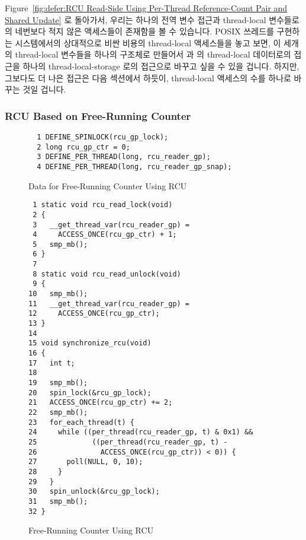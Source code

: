 Figure~\ref{fig:defer:RCU Read-Side Using Per-Thread Reference-Count Pair and Shared Update}
로 돌아가서, 우리는 하나의 전역 변수 접근과 thread-local 변수들로의 네번보다
적지 않은 액세스들이 존재함을 볼 수 있습니다.
POSIX 쓰레드를 구현하는 시스템에서의 상대적으로 비싼 비용의 thread-local
액세스들을 놓고 보면, 이 세개의 thread-local 변수들을 하나의 구조체로 만들어서
 과  의 thread-local 데이터로의
접근을 하나의 thread-local-storage 로의 접근으로 바꾸고 싶을 수 있을 겁니다.
하지만, 그보다도 더 나은 접근은 다음 섹션에서 하듯이, thread-local 액세스의
수를 하나로 바꾸는 것일 겁니다.
\iffalse

Referring back to
Figure~\ref{fig:defer:RCU Read-Side Using Per-Thread Reference-Count Pair and Shared Update},
we see that there is one global-variable access and no fewer than four
accesses to thread-local variables.
Given the relatively high cost of thread-local accesses on systems
implementing POSIX threads, it is tempting to collapse the three
thread-local variables into a single structure, permitting
\co{rcu_read_lock()} and \co{rcu_read_unlock()} to access their
thread-local data with a single thread-local-storage access.
However, an even better approach would be to reduce the number of
thread-local accesses to one, as is done in the next section.
\fi

\subsubsection{RCU Based on Free-Running Counter}
\label{defer:RCU Based on Free-Running Counter}

\begin{figure}[tbp]
{ \scriptsize
\begin{verbatim}
  1 DEFINE_SPINLOCK(rcu_gp_lock);
  2 long rcu_gp_ctr = 0;
  3 DEFINE_PER_THREAD(long, rcu_reader_gp);
  4 DEFINE_PER_THREAD(long, rcu_reader_gp_snap);
\end{verbatim}
}
\caption{Data for Free-Running Counter Using RCU}
\label{fig:defer:Data for Free-Running Counter Using RCU}
\end{figure}

\begin{figure}[tbp]
{ \scriptsize
\begin{verbatim}
 1 static void rcu_read_lock(void)
 2 {
 3   __get_thread_var(rcu_reader_gp) =
 4     ACCESS_ONCE(rcu_gp_ctr) + 1;
 5   smp_mb();
 6 }
 7 
 8 static void rcu_read_unlock(void)
 9 {
10   smp_mb();
11   __get_thread_var(rcu_reader_gp) =
12     ACCESS_ONCE(rcu_gp_ctr);
13 }
14 
15 void synchronize_rcu(void)
16 {
17   int t;
18 
19   smp_mb();
20   spin_lock(&rcu_gp_lock);
21   ACCESS_ONCE(rcu_gp_ctr) += 2;
22   smp_mb();
23   for_each_thread(t) {
24     while ((per_thread(rcu_reader_gp, t) & 0x1) &&
25             ((per_thread(rcu_reader_gp, t) -
26               ACCESS_ONCE(rcu_gp_ctr)) < 0)) {
27       poll(NULL, 0, 10);
28     }
29   }
30   spin_unlock(&rcu_gp_lock);
31   smp_mb();
32 }
\end{verbatim}
}
\caption{Free-Running Counter Using RCU}
\label{fig:defer:Free-Running Counter Using RCU}
\end{figure}

